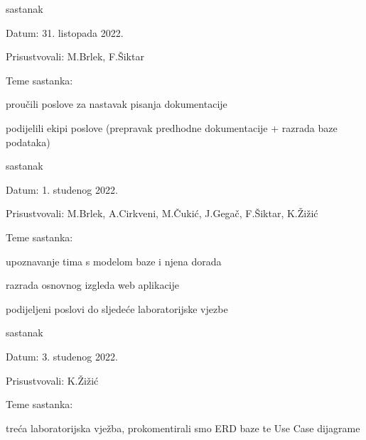 \begin{packed_enum}
			\item  sastanak
			\item[] \begin{packed_item}
				\item Datum: 31. listopada 2022.
				\item Prisustvovali: M.Brlek, F.Šiktar
				\item Teme sastanka:
				\begin{packed_item}
					\item  proučili poslove za nastavak pisanja dokumentacije
					\item  podijelili ekipi poslove (prepravak predhodne dokumentacije + razrada baze podataka)
				\end{packed_item}
			\end{packed_item}
			
			\item  sastanak
			\item[] \begin{packed_item}
				\item Datum: 1. studenog 2022.
				\item Prisustvovali: M.Brlek, A.Cirkveni, M.Čukić, J.Gegač, F.Šiktar, K.Žižić
				\item Teme sastanka:
				\begin{packed_item}
					\item  upoznavanje tima s modelom baze i njena dorada
					\item  razrada osnovnog izgleda web aplikacije
					\item  podijeljeni poslovi do sljedeće laboratorijske vjezbe
				\end{packed_item}
			\end{packed_item}
		
			\item  sastanak 
			\item[] \begin{packed_item}
				\item Datum: 3. studenog 2022.
				\item Prisustvovali: K.Žižić
				\item Teme sastanka:
				\begin{packed_item}
					\item treća laboratorijska vježba, prokomentirali smo ERD baze te Use Case dijagrame 
				\end{packed_item}
			\end{packed_item}
		

\end{packed_enum}
